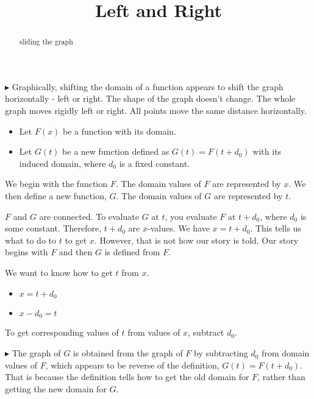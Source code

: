 \documentclass{ximera}
\title{Left and Right}
\begin{document}
\begin{abstract}
sliding the graph
\end{abstract}
\maketitle






$\blacktriangleright$ Graphically, shifting the domain of a function appears to shift the graph horizontally - left or right.  The shape of the graph doesn't change.  The whole graph moves rigidly left or right.  All points move the same distance horizontally. \\


\begin{itemize}
\item Let $F(x)$ be a function with its domain.

\item Let $G(t)$ be a new function defined as $G(t) = F(t+d_0)$ with its induced domain, where $d_0$ is a fixed constant.
\end{itemize}



We begin with the function $F$.  The domain values of $F$ are represented by $x$.  We then define a new function, $G$. The domain values of $G$ are represented by $t$. 

$F$ and $G$ are connected.  To evaluate $G$ at $t$, you evaluate $F$ at $t + d_0$, where $d_0$ is some constant.  Therefore, $t + d_0$ are $x$-values. We have $x = t + d_0$.  This tells us what to do to $t$ to get $x$.  However, that is not how our story is told.  Our story begins with $F$ and then $G$ is defined from $F$.  

We want to know how to get $t$ from $x$.  


\begin{itemize}
\item $x = t + d_0$

\item $x - d_0 = t$
\end{itemize}


To get corresponding values of $t$ from values of $x$, subtract $d_0$.   



$\blacktriangleright$  The graph of $G$ is obtained from the graph of $F$ by subtracting $d_0$ from domain values of $F$, which appears to be reverse of the definition, $G(t) = F(t+d_0)$.  That is because the definition tells how to get the old domain for $F$, rather than getting the new domain for $G$.
\end{document}
